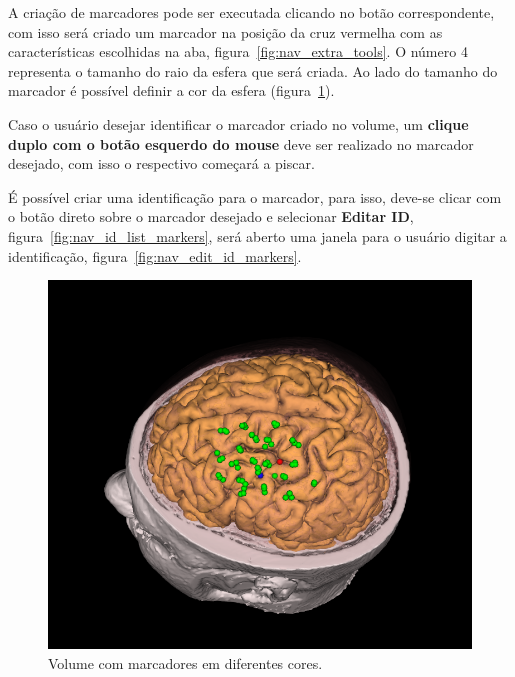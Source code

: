 A criação de marcadores pode ser executada clicando no botão correspondente, com isso será criado um marcador na posição da cruz vermelha com as características escolhidas na aba, figura~\ref{fig:nav_extra_tools}. O número 4 representa o tamanho do raio da esfera que será criada. Ao lado do tamanho do marcador é possível definir a cor da esfera (figura~\ref{fig:nav_vol_with_markers}). 

Caso o usuário desejar identificar o marcador criado no volume, um \textbf{clique duplo com o botão esquerdo do mouse} deve ser realizado no marcador desejado, com isso o respectivo começará a piscar.

É possível criar uma identificação para o marcador, para isso, deve-se clicar com o botão direto sobre o marcador desejado e selecionar \textbf{Editar ID}, figura~\ref{fig:nav_id_list_markers}, será aberto uma janela para o usuário digitar a identificação, figura~\ref{fig:nav_edit_id_markers}.

\begin{figure}[!htb]
\centering
\includegraphics[scale=0.4]{../user_guide_figures/invesalius_screen/nav_vol_with_markers.png}
\caption{Volume com marcadores em diferentes cores.}
\label{fig:nav_vol_with_markers}
\end{figure} 

